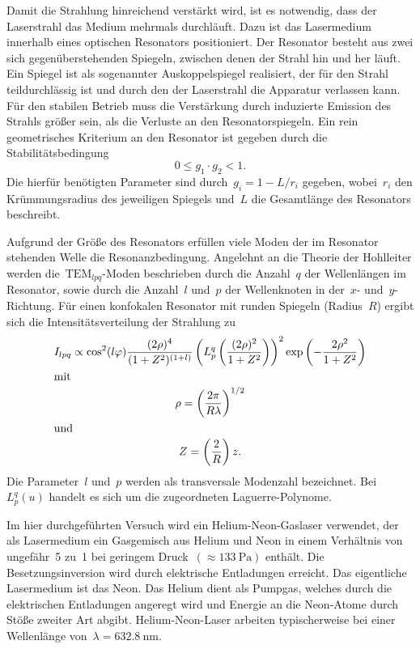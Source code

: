 Damit die Strahlung hinreichend verstärkt wird, ist es notwendig, dass der
Laserstrahl das Medium mehrmals durchläuft. Dazu ist das Lasermedium innerhalb
eines optischen Resonators positioniert. Der Resonator besteht aus zwei sich
gegenüberstehenden Spiegeln, zwischen denen der Strahl hin und her läuft. Ein
Spiegel ist als sogenannter Auskoppelspiegel realisiert, der für den Strahl
teildurchlässig ist und durch den der Laserstrahl die Apparatur verlassen kann.
Für den stabilen Betrieb muss die Verstärkung durch induzierte Emission des
Strahls größer sein, als die Verluste an den Resonatorspiegeln. Ein rein
geometrisches Kriterium an den Resonator ist gegeben durch die
Stabilitätsbedingung
%
\begin{equation}
  0\leq g_1\cdot g_2<1.
  \label{eq:bedingung}
\end{equation}
%
Die hierfür benötigten Parameter sind durch~$g_i=1-L/r_i$ gegeben, wobei~$r_i$
den Krümmungsradius des jeweiligen Spiegels und~$L$ die Gesamtlänge des
Resonators beschreibt.

Aufgrund der Größe des Resonators erfüllen viele Moden der im Resonator
stehenden Welle die Resonanzbedingung. Angelehnt an die Theorie der Hohlleiter
werden die~$\text{TEM}_{lpq}$-Moden beschrieben durch die Anzahl~$q$ der
Wellenlängen im Resonator, sowie durch die Anzahl~$l$ und~$p$ der Wellenknoten
in der~$x$- und~$y$-Richtung. Für einen konfokalen Resonator mit runden Spiegeln
(Radius~$R$) ergibt sich die Intensitätsverteilung der Strahlung zu
%
\begin{gather}
  I_{lpq}\propto\cos^2(l\varphi)\frac{(2\rho)^4}{(1+Z^2)^{(1+l)}}\left(L_p^q\left(\frac{(2\rho)^2}{1+Z^2}\right)\right)^2\exp\left(-\frac{2\rho^2}{1+Z^2}\right) \\
  \shortintertext{mit}
  \rho=\left(\frac{2\pi}{R\lambda}\right)^{1/2} \\
  \shortintertext{und}
  Z=\left(\frac{2}{R}\right)z.
\end{gather}
%
Die Parameter~$l$ und~$p$ werden als transversale Modenzahl bezeichnet.
Bei~$L_p^q(u)$ handelt es sich um die zugeordneten Laguerre-Polynome.

Im hier durchgeführten Versuch wird ein Helium-Neon-Gaslaser verwendet, der als
Lasermedium ein Gasgemisch aus Helium und Neon in einem Verhältnis von
ungefähr~\num{5} zu~\num{1} bei geringem Druck~$(\approx\SI{133}{\pascal})$
enthält. Die Besetzungsinversion wird durch elektrische Entladungen erreicht.
Das eigentliche Lasermedium ist das Neon. Das Helium dient als Pumpgas, welches
durch die elektrischen Entladungen angeregt wird und Energie an die Neon-Atome
durch Stöße zweiter Art abgibt. Helium-Neon-Laser arbeiten typischerweise bei
einer Wellenlänge von~$\lambda=\SI{632.8}{\nano\metre}$.

